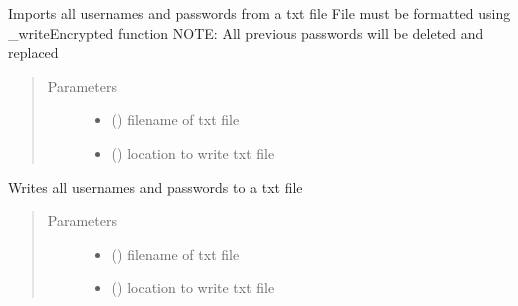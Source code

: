 \documentclass[letterpaper,10pt,english]{sphinxmanual}
\begin{document}
\begin{fulllineitems}
\begin{fulllineitems}
\label{\detokenize{sample:sample.passwordAuthentication.Password.readEncrypted}}
Imports all usernames and passwords from a txt file
File must be formatted using \_writeEncrypted function
NOTE: All previous passwords will be deleted and replaced
\begin{quote}\begin{description}
\item[{Parameters}] \leavevmode\begin{itemize}
\item {} 
 () \textendash{} filename of txt file

\item {} 
 () \textendash{} location to write txt file

\end{itemize}

\end{description}\end{quote}

\end{fulllineitems}


\begin{fulllineitems}
\label{\detokenize{sample:sample.passwordAuthentication.Password.writeEncrypted}}
Writes all usernames and passwords to a txt file
\begin{quote}\begin{description}
\item[{Parameters}] \leavevmode\begin{itemize}
\item {} 
 () \textendash{} filename of txt file

\item {} 
 () \textendash{} location to write txt file

\end{itemize}

\end{description}\end{quote}

\end{fulllineitems}


\end{fulllineitems}
\end{document}
